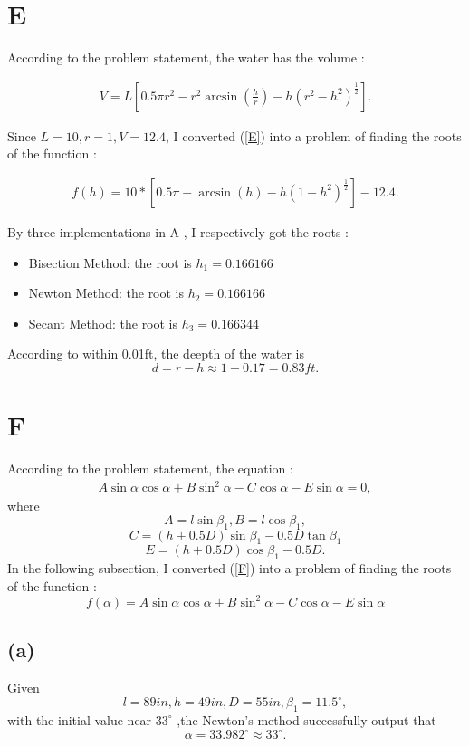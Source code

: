 \documentclass[a4paper]{article}
\begin{document}
\section{E}
According to the problem statement, the water has the volume :

\begin{align}\label{E}
V=L[0.5\pi r^2-r^2\arcsin(\frac{h}{r})-h(r^2-h^2)^{\frac{1}{2}}].
\end{align}

Since \( L = 10, r = 1, V = 12.4\), I converted (\ref{E}) into a problem of finding the roots of the function :

\begin{align}
  f(h)=10*[0.5\pi-\arcsin(h)-h(1-h^2)^{\frac{1}{2}}]-12.4.
\end{align}

By three implementations in A , I respectively got the roots :

\begin{itemize}  
  \item Bisection Method: the root is $h_1 = 0.166166$  
  \item Newton Method: the root is $h_2 = 0.166166$  
  \item Secant Method: the root is $h_3 = 0.166344$  
\end{itemize}  
According to within 0.01ft, the deepth of the water is
$$d = r - h \approx 1 - 0.17 = 0.83ft.$$

\section{F}
According to the problem statement, the equation :
\begin{align}\label{F}
  A\sin\alpha \cos\alpha +B\sin^2 \alpha-C\cos \alpha -E\sin\alpha = 0,
\end{align}
where
$$A = l\sin\beta_1, B = l\cos\beta_1,$$
$$C = (h+0.5D)\sin\beta_1 - 0.5D\tan \beta_1$$
$$E = (h+0.5D)\cos\beta_1-0.5D.$$
In the following subsection, I converted (\ref{F}) into a problem of finding the roots of the function :
$$f(\alpha) = A\sin\alpha \cos\alpha +B\sin^2 \alpha-C\cos \alpha -E\sin\alpha$$
\subsection*{(a)}
Given $$ l = 89 in, h = 49 in, D = 55 in, \beta_1 = 11.5^{\circ},$$ with the initial value near $33^{\circ}$ ,the Newton's method successfully output that 
$$\alpha = 33.982^{\circ} \approx 33^{\circ}.$$
\end{document}
